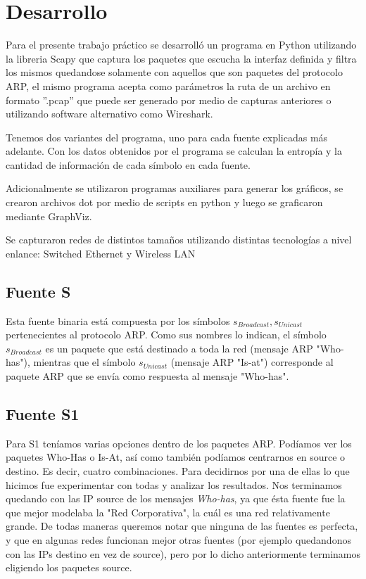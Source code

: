 \section{Desarrollo}

Para el presente trabajo práctico se desarrolló un programa en Python utilizando la libreria Scapy que captura los paquetes que escucha la interfaz definida y filtra los mismos quedandose solamente con aquellos que son paquetes del protocolo ARP, el mismo programa acepta como parámetros la ruta de un archivo en formato ''.pcap'' que puede ser generado por medio de capturas anteriores o utilizando software alternativo como Wireshark.

Tenemos dos variantes del programa, uno para cada fuente explicadas más adelante. Con los datos obtenidos por el programa se calculan la entropía y la cantidad de información de cada símbolo en cada fuente.

Adicionalmente se utilizaron programas auxiliares para generar los gráficos, se crearon archivos dot por medio de scripts en python y luego se graficaron mediante GraphViz.

Se capturaron redes de distintos tamaños utilizando distintas tecnologías a nivel enlance: Switched Ethernet y Wireless LAN


\subsection{Fuente S}
Esta fuente binaria está compuesta por los símbolos ${s_{Broadcast}, s_{Unicast}}$ pertenecientes al protocolo ARP. Como sus nombres lo indican, el símbolo $s_{Broadcast}$ es un paquete que está destinado a toda la red (mensaje ARP "Who-has"), mientras que el símbolo $s_{Unicast}$ (mensaje ARP "Is-at") corresponde al paquete ARP que se envía como respuesta al mensaje "Who-has".

\subsection{Fuente S1}
Para S1 teníamos varias opciones dentro de los paquetes ARP. Podíamos ver los paquetes Who-Has o Is-At, así como también podíamos centrarnos en source o destino. Es decir, cuatro combinaciones. Para decidirnos por una de ellas lo que hicimos fue experimentar con todas y analizar los resultados. Nos terminamos quedando con las IP source de los mensajes \textit{Who-has}, ya que ésta fuente fue la que mejor modelaba la "Red Corporativa", la cuál es una red relativamente grande. De todas maneras queremos notar que ninguna de las fuentes es perfecta, y que en algunas redes funcionan mejor otras fuentes (por ejemplo quedandonos con las IPs destino en vez de source), pero por lo dicho anteriormente terminamos eligiendo los paquetes source.



